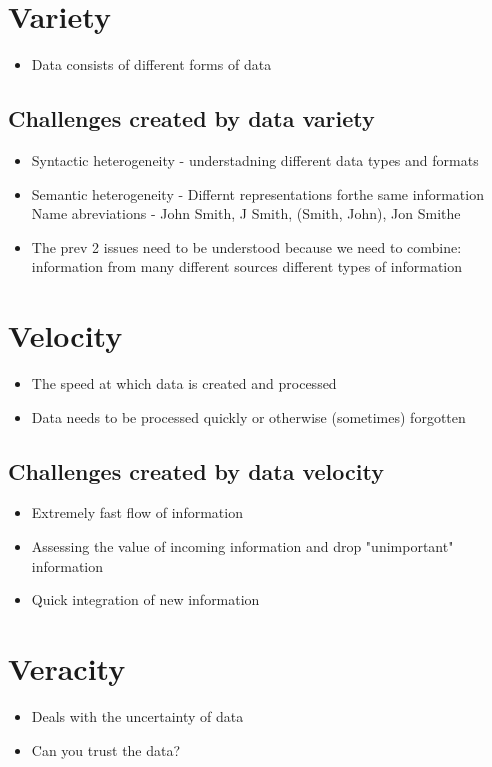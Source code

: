 \documentclass[10pt,a4paper]{scrreprt}
\begin{document}
\section{Variety}
\begin{itemize}
	\item Data consists of different forms of data
\end{itemize}

\subsection{Challenges created by data variety}
\begin{itemize}
	\item Syntactic heterogeneity - understadning different data types and formats
	\item Semantic heterogeneity - Differnt representations forthe same information
		\subitem Name abreviations - John Smith, J Smith, (Smith, John), Jon Smithe
	\item The prev 2 issues need to be understood because we need to combine:
		\subitem information from many different sources
		\subitem different types of information
\end{itemize}


\section{Velocity}
\begin{itemize}
	\item The speed at which data is created and processed
	\item Data needs to be processed quickly or otherwise (sometimes) forgotten
\end{itemize}

\subsection{Challenges created by data velocity}
\begin{itemize}
	\item Extremely fast flow of information
	\item Assessing the value of incoming information and drop "unimportant" information
	\item Quick integration of new information
\end{itemize}


\section{Veracity}
\begin{itemize}
	\item Deals with the uncertainty of data
	\item Can you trust the data?
\end{itemize}
\end{document}
